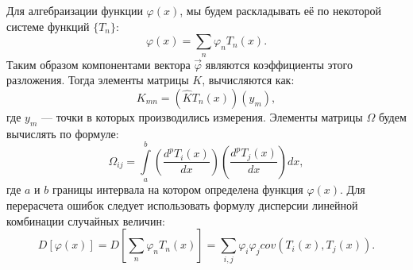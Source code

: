 Для алгебраизации функции $\varphi(x)$, мы будем раскладывать её по некоторой системе функций $\{T_n\}$:
\begin{equation}
\varphi(x) = \sum \limits_n \varphi_n T_n(x).
\end{equation}
Таким образом компонентами вектора $\vec{\varphi}$ являются коэффициенты этого разложения. Тогда элементы матрицы $K$, вычисляются как:
\begin{equation}
K_{mn} = (\hat{K}T_n(x))(y_m),
\end{equation}
где $y_m$ --- точки в которых производились измерения. Элементы матрицы $\Omega$ будем вычислять по формуле:
\begin{equation}
\Omega_{ij} = \int\limits_a^b \left(\frac{d^pT_i(x)}{dx}\right)\left(\frac{d^pT_j(x)}{dx}\right)dx,
\end{equation}
где $a$ и $b$ границы интервала на котором определена функция $\varphi(x)$.
Для перерасчета ошибок следует использовать формулу дисперсии линейной комбинации случайных величин:
\begin{equation}
D[\varphi(x)] = D[\sum \limits_n \varphi_n T_n(x)] = \sum\limits_{i,j} \varphi_i\varphi_j cov(T_i(x), T_j(x)).
\end{equation}

